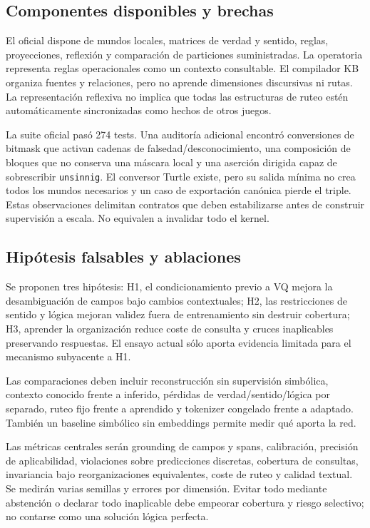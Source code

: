 \documentclass[11pt,a4paper]{article}
\begin{document}
\subsection{Componentes disponibles y brechas}
El oficial dispone de mundos locales, matrices de verdad y sentido, reglas,
proyecciones, reflexión y comparación de particiones suministradas. La operatoria
representa reglas operacionales como un contexto consultable. El compilador KB
organiza fuentes y relaciones, pero no aprende dimensiones discursivas ni rutas.
La representación reflexiva no implica que todas las estructuras de ruteo estén
automáticamente sincronizadas como hechos de otros juegos.

La suite oficial pasó 274 tests. Una auditoría adicional encontró conversiones
de bitmask que activan cadenas de falsedad/desconocimiento, una composición de
bloques que no conserva una máscara local y una aserción dirigida capaz de
sobrescribir \texttt{unsinnig}. El conversor Turtle existe, pero su salida mínima
no crea todos los mundos necesarios y un caso de exportación canónica pierde
el triple. Estas observaciones delimitan contratos que deben estabilizarse antes
de construir supervisión a escala. No equivalen a invalidar todo el kernel.

\subsection{Hipótesis falsables y ablaciones}
Se proponen tres hipótesis: H1, el condicionamiento previo a VQ mejora la
desambiguación de campos bajo cambios contextuales; H2, las restricciones de
sentido y lógica mejoran validez fuera de entrenamiento sin destruir cobertura;
H3, aprender la organización reduce coste de consulta y cruces inaplicables
preservando respuestas. El ensayo actual sólo aporta evidencia limitada para
el mecanismo subyacente a H1.

Las comparaciones deben incluir reconstrucción sin supervisión simbólica,
contexto conocido frente a inferido, pérdidas de verdad/sentido/lógica por
separado, ruteo fijo frente a aprendido y tokenizer congelado frente a adaptado.
También un baseline simbólico sin embeddings permite medir qué aporta la red.

Las métricas centrales serán grounding de campos y spans, calibración, precisión
de aplicabilidad, violaciones sobre predicciones discretas, cobertura de consultas,
invariancia bajo reorganizaciones equivalentes, coste de ruteo y calidad textual.
Se medirán varias semillas y errores por dimensión. Evitar todo mediante
abstención o declarar todo inaplicable debe empeorar cobertura y riesgo selectivo;
no contarse como una solución lógica perfecta.
\end{document}
